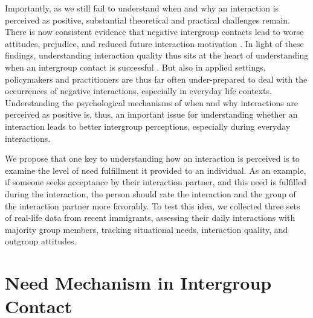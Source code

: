 \documentclass[man, 12pt, a4paper, mask]{apa7}
\theoremstyle{break}
\theoremstyle{plain}
\begin{document}
Importantly, as we still fail to understand when and why an interaction is perceived as positive, substantial theoretical and practical challenges remain. There is now consistent evidence that negative intergroup contacts lead to worse attitudes, prejudice, and reduced future interaction motivation \citep[e.g.,][]{Barlow2012, Prati2021, Graf2014}. In light of these findings, understanding interaction quality thus sits at the heart of understanding when an intergroup contact is successful \citep[e.g.,][]{Allport1954b, Brown2007, Tropp2016}. But also in applied settings, policymakers and practitioners are thus far often under-prepared to deal with the occurrences of negative interactions, especially in everyday life contexts. Understanding the psychological mechanisms of when and why interactions are perceived as positive is, thus, an important issue for understanding whether an interaction leads to better intergroup perceptions, especially during everyday interactions.

We propose that one key to understanding how an interaction is perceived is to examine the level of need fulfillment it provided to an individual. As an example, if someone seeks acceptance by their interaction partner, and this need is fulfilled during the interaction, the person should rate the interaction and the group of the interaction partner more favorably. To test this idea, we collected three sets of real-life data from recent immigrants, assessing their daily interactions with majority group members, tracking situational needs, interaction quality, and outgroup attitudes. 

\section{Need Mechanism in Intergroup Contact}
\end{document}

